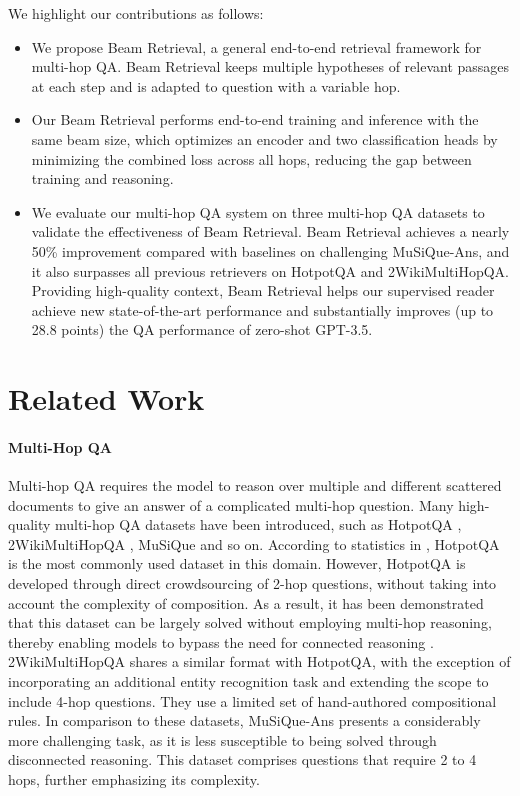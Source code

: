 \documentclass[10.5pt]{article}
\begin{document}
We highlight our contributions as follows:
\begin{itemize}
\item We propose Beam Retrieval, a general end-to-end retrieval framework for multi-hop QA. Beam Retrieval keeps multiple hypotheses of relevant passages at each step and is adapted to question with a variable hop.
\item Our Beam Retrieval performs end-to-end training and inference with the same beam size, which optimizes an encoder and two classification heads by minimizing the combined loss across all hops, reducing the gap between training and reasoning.
\item We evaluate our multi-hop QA system on three multi-hop QA datasets to validate the effectiveness of Beam Retrieval. Beam Retrieval achieves a nearly 50\% improvement compared with baselines on challenging MuSiQue-Ans, and it also surpasses all previous retrievers on HotpotQA and 2WikiMultiHopQA. Providing high-quality context, Beam Retrieval helps our supervised reader achieve new state-of-the-art performance and substantially improves (up to 28.8 points) the QA performance of zero-shot GPT-3.5.
\end{itemize}

\section{Related Work}

\paragraph{Multi-Hop QA}\label{related_work}
Multi-hop QA requires the model to reason over multiple and different scattered documents to give an answer of a complicated multi-hop question. Many high-quality multi-hop QA datasets have been introduced, such as HotpotQA \cite{yang-etal-2018-hotpotqa}, 2WikiMultiHopQA \cite{DBLP:journals/corr/abs-2011-01060} , MuSiQue \cite{musique} and so on. According to statistics in \cite{multihop_survey}, HotpotQA is the most commonly used dataset in this domain. However, HotpotQA is developed through direct crowdsourcing of 2-hop questions, without taking into account the complexity of composition. As a result, it has been demonstrated that this dataset can be largely solved without employing multi-hop reasoning, thereby enabling models to bypass the need for connected reasoning \cite{min-etal-2019-compositional, chen2019understanding, trivedi-etal-2020-multihop}. 2WikiMultiHopQA shares a similar format with HotpotQA, with the exception of incorporating an additional entity recognition task and extending the scope to include 4-hop questions. They use a limited set of hand-authored compositional rules. In comparison to these datasets, MuSiQue-Ans presents a considerably more challenging task, as it is less susceptible to being solved through disconnected reasoning. This dataset comprises questions that require 2 to 4 hops, further emphasizing its complexity.
\end{document}
